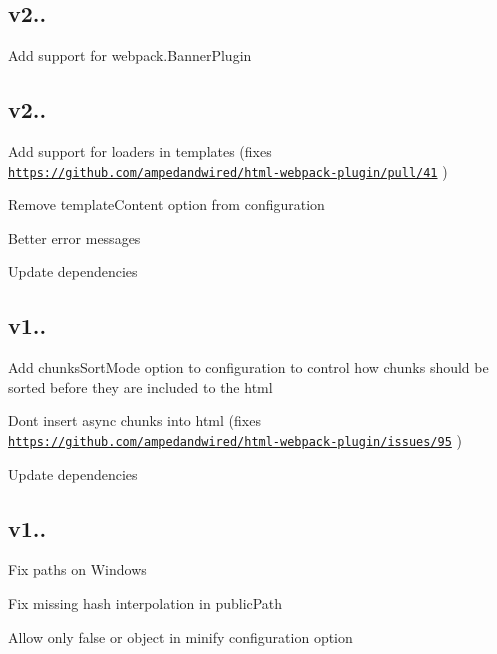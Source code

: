 \subsection*{v2.. }


\begin{DoxyItemize}
\item Add support for webpack.\+Banner\+Plugin
\end{DoxyItemize}

\subsection*{v2.. }


\begin{DoxyItemize}
\item Add support for loaders in templates (fixes \href{https://github.com/ampedandwired/html-webpack-plugin/pull/41}{\tt https\+://github.\+com/ampedandwired/html-\/webpack-\/plugin/pull/41} )
\item Remove {\ttfamily template\+Content} option from configuration
\item Better error messages
\item Update dependencies
\end{DoxyItemize}

\subsection*{v1.. }


\begin{DoxyItemize}
\item Add {\ttfamily chunks\+Sort\+Mode} option to configuration to control how chunks should be sorted before they are included to the html
\item Don\textquotesingle{}t insert async chunks into html (fixes \href{https://github.com/ampedandwired/html-webpack-plugin/issues/95}{\tt https\+://github.\+com/ampedandwired/html-\/webpack-\/plugin/issues/95} )
\item Update dependencies
\end{DoxyItemize}

\subsection*{v1.. }


\begin{DoxyItemize}
\item Fix paths on Windows
\item Fix missing hash interpolation in public\+Path
\item Allow only {\ttfamily false} or {\ttfamily object} in {\ttfamily minify} configuration option
\end{DoxyItemize}

